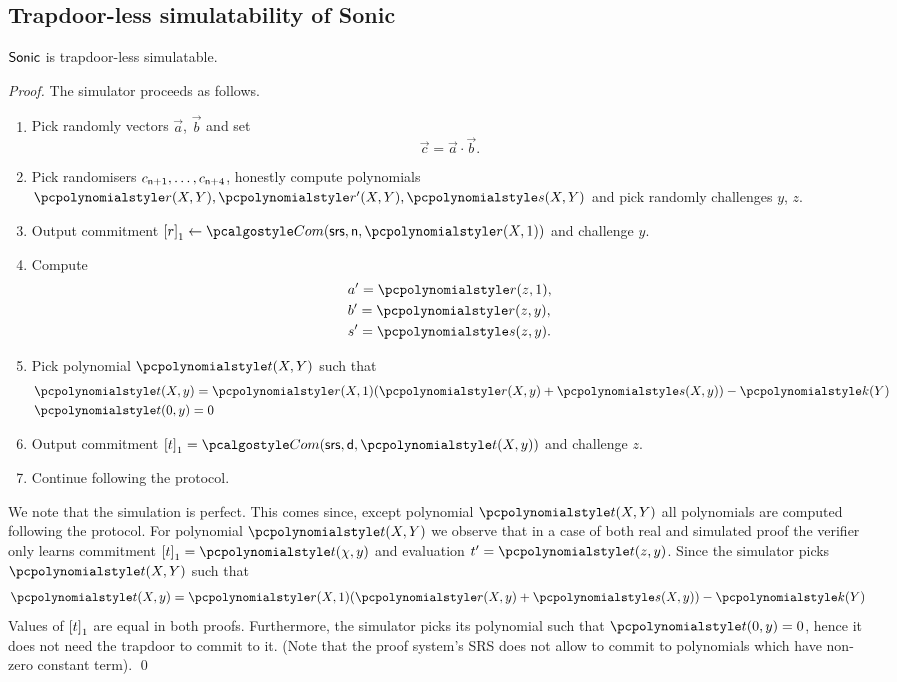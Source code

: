 \subsection{Trapdoor-less simulatability of Sonic}
\begin{lemma}
\label{lem:sonic_hvzk}
${\textnormal{\textsf{Sonic}}}$ is trapdoor-less simulatable.
\end{lemma}
\begin{proof}
  The simulator proceeds as follows.
  \begin{enumerate}
  \item Pick randomly vectors $\vec{a}$, $\vec{b}$ and set
    \begin{equation}
      \label{eq:ab_eq_c}
      \vec{c} = \vec{a} \cdot \vec{b}. 
    \end{equation}
  \item Pick randomisers $c_{\mathsf{n} + 1}, \ldots, c_{\mathsf{n} + 4}$,
    honestly compute polynomials $\p{r}(X, Y), \p{r'}(X, Y), \p{s}(X, Y)$ and
    pick randomly challenges $y$, $z$.
  \item Output commitment $\gone{r} \gets \com(\srs, \multconstr, \p{r} (X,
    1))$ and challenge $y$. 
  \item Compute
    \begin{align*}
      & a' = \p{r}(z, 1),\\
      & b' = \p{r}(z, y),\\
      & s' = \p{s}(z, y).
    \end{align*} 
  \item Pick polynomial $\p{t}(X, Y)$ such that
    \begin{align*}
      & \p{t} (X, y) = \p{r} (X, 1) (\p{r}(X, y) + \p{s} (X, y)) - \p{k} (Y)\\
      & \p{t} (0, y) = 0
    \end{align*}
  \item Output commitment $\gone{t} = \com (\srs, \dconst, \p{t} (X, y))$ and
    challenge $z$.
  \item Continue following the protocol.
  \end{enumerate}

  We note that the simulation is perfect. This comes since, except polynomial
  $\p{t} (X, Y)$ all polynomials are computed following the protocol. For
  polynomial $\p{t} (X, Y)$ we observe that in a case of both real and simulated
  proof the verifier only learns commitment $\gone{t} = \p{t} (\chi, y)$ and
  evaluation $t' = \p{t} (z, y)$. Since the simulator picks $\p{t} (X, Y)$ such
  that 
  \begin{align*}
      \p{t} (X, y) = \p{r} (X, 1) (\p{r}(X, y) + \p{s} (X, y)) - \p{k} (Y)
  \end{align*}
  Values of $\left[t\right]_{1}$ are equal in both proofs.
  Furthermore, the simulator picks its polynomial such that $\p{t}(0, y) = 0$,
  hence it does not need the trapdoor to commit to it. (Note that the proof
  system's SRS does not allow to commit to polynomials which have non-zero
  constant term). \qed
\end{proof}
